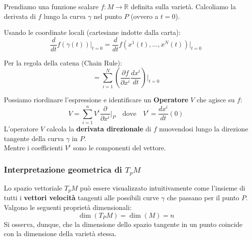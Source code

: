 \documentclass[openany]{book}
\theoremstyle{definition}
\theoremstyle{remark}
\begin{document}
Prendiamo una funzione scalare $f: M \to \mathbb{R}$ definita sulla varietà.
Calcoliamo la derivata di $f$ lungo la curva $\gamma$ nel punto $P$ (ovvero a $t=0$).

Usando le coordinate locali (cartesiane indotte dalla carta):
\begin{equation}
    \frac{d}{dt} f(\gamma(t)) \bigg|_{t=0} = \frac{d}{dt} f(x^1(t), \dots, x^N(t)) \bigg|_{t=0}
\end{equation}

Per la regola della catena (Chain Rule):
\[ = \sum_{i=1}^N \left( \frac{\partial f}{\partial x^i} \frac{dx^i}{dt} \right)\bigg|_{t=0} \]


Possiamo riordinare l'espressione e identificare un \textbf{Operatore} $V$ che agisce su $f$:
\[ V = \sum_{i=1}^n V^i \frac{\partial}{\partial x^i}\bigg|_P \quad \text{dove} \quad V^i = \frac{dx^i}{dt}(0) \]
L'operatore $V$ calcola la \textbf{derivata direzionale} di $f$ muovendosi lungo la direzione tangente della curva $\gamma$ in $P$.
\\
Mentre i coefficienti $V^i$ sono le componenti del vettore.

\subsubsection*{Interpretazione geometrica di $T_pM$}

Lo spazio vettoriale $T_p M$ può essere visualizzato intuitivamente come l'insieme di tutti i \textbf{vettori velocità} tangenti alle possibili curve $\gamma$ che passano per il punto $P$.
Valgono le seguenti proprietà dimensionali:
\begin{equation}
    \dim(T_P M) = \dim(M) = n
\end{equation} 
Si osserva, dunque, che la dimensione dello spazio tangente in un punto coincide con la dimensione della varietà stessa.

\begin{center}
\end{center}
\end{document}
